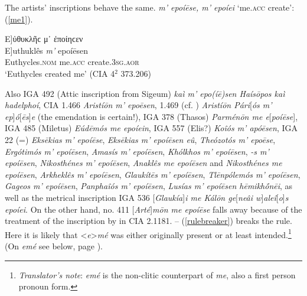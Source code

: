 The artists' inscriptions behave the same.\label{forAddenda3} \emph{m' epoíēse, m' epoíei} `me.\textsc{acc} create': (\ref{me1}).

\begin{exe}
\ex {[}Ε{]}ὐθυκλῆϲ μ᾽ ἐποίηϲεν\\
\gll {[}E{]}uthuklês \emph{m'} epoíēsen\\
Euthycles.\textsc{nom} me.\textsc{acc} create.\textsc{3sg.aor}\\
\trans `Euthycles created me' (CIA 4$^2$ 373.206)
\label{me1}
\end{exe}

Also IGA 492 (Attic inscription from Sigeum) \textit{kaì \emph{m'} epo(íē)sen Haísōpos kaì hadelphoí}, CIA 1.466 \textit{Aristíōn \emph{m'} epoēsen}, 1.469 (cf. \citealp[15]{Loewy1885}) \textit{Aristíōn Pári}{[}\textit{ós \emph{m'} ep}{]}\textit{ó}{[}\textit{ēs}{]}\textit{e} (the emendation is certain!), IGA 378 (Thasos) \textit{Parménōn \emph{me} e}{[}\textit{poíēse}{]}, IGA 485 (Miletus) \textit{Eúdēmós \emph{me} epoíein}, IGA 557 (Elis?) \textit{Koîós \emph{m'} apóēsen}, IGA 22 (=\citealp[40]{Klein1887}) \textit{Eksēkias \emph{m'} epoíēse}, \citet[41]{Klein1887} \textit{Eksēkias \emph{m'} epoíēsen eû}, \citet[31]{Klein1887} \textit{Theózotós \emph{m'} epoēse}, \citet[34]{Klein1887} \textit{Ergótimós \emph{m'} epoíēsen}, \citet[43, 45 b, 48]{Klein1887} \textit{Amasís \emph{m'} epoíēsen}, \citet[48]{Klein1887} \textit{Khólkhos \emph{m'} epoíēsen}, \citet[66]{Klein1887} \textit{-s \emph{m'} epoíēsen}, \citet[71]{Klein1887} \textit{Nikosthénes \emph{m'} epoíēsen}, \citet[75]{Klein1887} \textit{Anaklês \emph{me} epoíēsen} and \textit{Nikosthénes \emph{me} epoíēsen}, \citet[76]{Klein1887} \textit{Arkheklês \emph{m'} epoíēsen}, \citet[77]{Klein1887} \textit{Glaukítēs \emph{m'} epoíēsen}, \citet[84 b]{Klein1887} \textit{Tlēnpólemós \emph{m'} epoíēsen}, \citet[85]{Klein1887} \textit{Gageos \emph{m'} epoíēsen}, \citet[90]{Klein1887} \textit{Panphaîós \emph{m'} epoíēsen}, \citet[213]{Klein1887} \textit{Lusías \emph{m'} epoíēsen hēmikhṓnēi}, as well as the metrical inscription IGA 536 {[}\textit{Glaukía}{]}\textit{i \emph{me} Kálōn ge}{[}\textit{neâi w}{]}\textit{aleî}{[}\textit{o}{]}\textit{s epoíei}. On the other hand, \citet[281]{Loewy1885} no. 411 {[}\textit{Arté}{]}\textit{mōn \emph{me} epoíēse} falls away because of the treatment of the inscription by \citet[7]{Koehler1888} in CIA 2.1181. -- (\ref{rulebreaker}) breaks the rule. Here it is likely that {<}\textit{e}{>}\textit{mé} was either originally present or at least intended.\footnote{\emph{Translator's note}: \textit{emé} is the non-clitic counterpart of \textit{me}, also a first person  pronoun form.} (On \textit{emé} see below, page \pageref{eme}).

